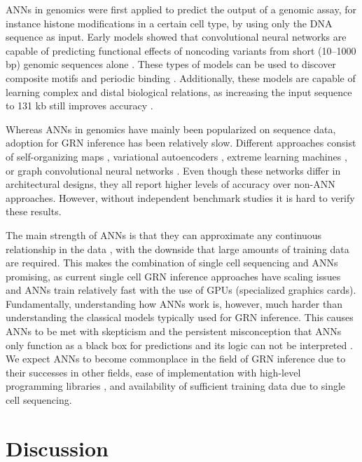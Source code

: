 ANNs in genomics were first applied to predict the output of a genomic assay, for instance histone modifications in a certain cell type, by using only the DNA sequence as input. Early models showed that convolutional neural networks are capable of predicting functional effects of noncoding variants from short (10–1000 bp) genomic sequences alone \cite{Alipanahi_2015,Zhou_2015}. These types of models can be used to discover composite motifs and periodic binding \cite{Avsec_2021}. Additionally, these models are capable of learning complex and distal biological relations, as increasing the input sequence to 131 kb still improves accuracy \cite{Kelley_2018}.

Whereas ANNs in genomics have mainly been popularized on sequence data, adoption for GRN inference has been relatively slow. Different approaches consist of self-organizing maps \cite{Jansen_2019}, variational autoencoders \cite{Shu_2021}, extreme learning machines \cite{Rubiolo_2017}, or graph convolutional neural networks \cite{https://doi.org/10.48550/arxiv.1806.06975,Wang_2020}. Even though these networks differ in architectural designs, they all report higher levels of accuracy over non-ANN approaches. However, without independent benchmark studies it is hard to verify these results.

The main strength of ANNs is that they can approximate any continuous relationship in the data \cite{Cybenko_1989,Hornik_1989}, with the downside that large amounts of training data are required. This makes the combination of single cell sequencing and ANNs promising, as current single cell GRN inference approaches have scaling issues \cite{McCalla_2021} and ANNs train relatively fast with the use of GPUs (specialized graphics cards). Fundamentally, understanding how ANNs work is, however, much harder than understanding the classical models typically used for GRN inference. This causes ANNs to be met with skepticism and the persistent misconception that ANNs only function as a black box for predictions and its logic can not be interpreted \cite{Zhang_2021}. We expect ANNs to become commonplace in the field of GRN inference due to their successes in other fields, ease of implementation with high-level programming libraries \cite{chollet2015keras,https://doi.org/10.48550/arxiv.1912.01703}, and availability of sufficient training data due to single cell sequencing.

\section{Discussion}

